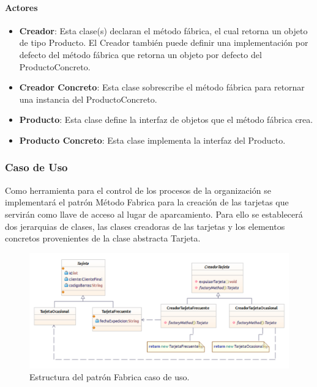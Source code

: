\paragraph{Actores}

\begin{itemize}
	\item \textbf{Creador}: Esta clase(s) declaran el método fábrica, el cual retorna un objeto de tipo Producto. El Creador también puede definir una implementación por defecto del método fábrica que retorna un objeto por defecto del ProductoConcreto.
	\item \textbf{Creador Concreto}: Esta clase sobrescribe el método fábrica para retornar una instancia del ProductoConcreto.
	\item \textbf{Producto}: Esta clase define la interfaz de objetos que el método fábrica crea.
	\item \textbf{Producto Concreto}: Esta clase implementa la interfaz del Producto.	
\end{itemize}

\subsubsection{Caso de Uso}
Como herramienta para el control de los procesos de la organización se implementará el patrón Método Fabrica para la creación de las tarjetas que servirán como llave de acceso al lugar de aparcamiento. Para ello se establecerá dos jerarquias de clases, las clases creadoras de las tarjetas y los elementos concretos provenientes de la clase abstracta Tarjeta.

\begin{figure}[th!]
	\centering
	\includegraphics[width=.7\linewidth]{imagenes/Patrones/Builder_caso.pdf}
	\caption{Estructura del patrón Fabrica caso de uso.\cite{gof}}	
\end{figure}



